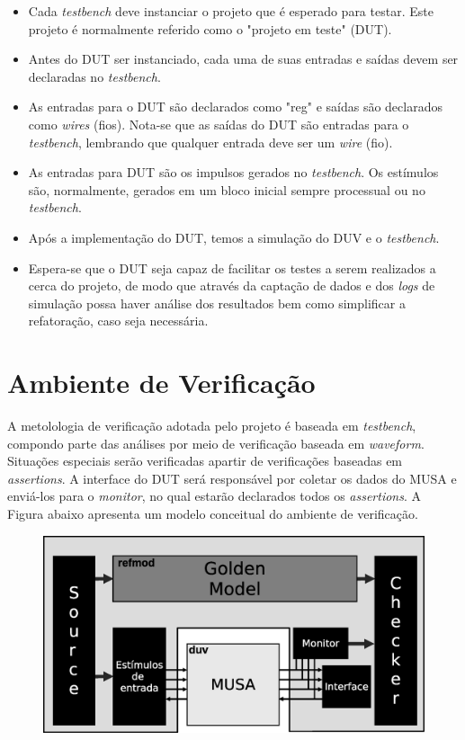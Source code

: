 \documentclass{article}
\begin{document}
	\begin{itemize}
	
  		\item Cada \textit{testbench} deve instanciar o projeto que é esperado para testar. Este projeto é normalmente referido como o "projeto em teste" (DUT).
  		
  		\item Antes do DUT ser instanciado, cada uma de suas entradas e saídas devem ser declaradas no \textit{testbench}.
  		
  		\item As entradas para o DUT são declarados como "reg" e saídas são declarados como \textit{wires} (fios). Nota-se que as saídas do DUT são entradas para o \textit{testbench}, lembrando que qualquer entrada deve ser um \textit{wire} (fio).
  		
  		\item As entradas para DUT são os impulsos gerados no \textit{testbench}. Os estímulos são, normalmente, gerados em um bloco inicial sempre processual ou no \textit{testbench}.
  		
  		\item Após a implementação do DUT, temos a simulação do DUV e o \textit{testbench}.
  		
  		\item Espera-se que o DUT seja capaz de facilitar os testes a serem realizados a cerca do projeto, de modo que através da captação de dados e dos \textit{logs} de simulação possa haver análise dos resultados bem como simplificar a refatoração, caso seja necessária.
  		
	\end{itemize}
  	
	\newpage
	\section{Ambiente de Verificação}
	
  A metolologia de verificação adotada pelo projeto é baseada em \textit{testbench}, compondo parte das análises por meio de verificação baseada em \textit{waveform}. Situações especiais serão verificadas apartir de verificações baseadas em \textit{assertions}. A interface do DUT será responsável por coletar os dados do MUSA e enviá-los para o \textit{monitor}, no qual estarão declarados todos os \textit{assertions}. A Figura abaixo apresenta um modelo conceitual do ambiente de verificação.
		
	\begin{figure}[H]
    	\centering
    	\includegraphics[width=.7\linewidth]{pictures/ver_model.eps}
  	\end{figure} 
\end{document}
